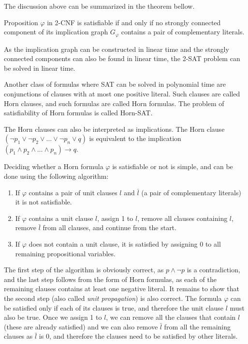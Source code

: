 The discussion above can be summarized in the theorem bellow.

\begin{theorem}
Proposition $\varphi$ in 2-CNF is satisfiable if and only if no strongly connected component of its implication graph $G_\varphi$ contains a pair of complementary literals.
\end{theorem}

As the implication graph can be constructed in linear time and the strongly connected components can also be found in linear time, the 2-SAT problem can be solved in linear time.

Another class of formulas where SAT can be solved in polynomial time are conjunctions of clauses with at most one positive literal. Such clauses are called Horn clauses, and such formulas are called Horn formulas. The problem of satisfiability of Horn formulas is called Horn-SAT.

The Horn clauses can also be interpreted as implications. The Horn clause $(\neg p_1 \lor \neg p_2 \lor \dots \lor \neg p_n \lor q)$ is equivalent to the implication $(p_1 \land p_2 \land \dots \land p_n) \to q$.

Deciding whether a Horn formula $\varphi$ is satisfiable or not is simple, and can be done using the following algorithm:

\begin{enumerate}
  \item If $\varphi$ contains a pair of unit clauses $l$ and $\bar{l}$ (a pair of complementary literals) it is not satisfiable.
  \item If $\varphi$ contains a unit clause $l$, assign 1 to $l$, remove all clauses containing $l$, remove $\bar{l}$ from all clauses, and continue from the start.
  \item If $\varphi$ does not contain a unit clause, it is satisfied by assigning 0 to all remaining propositional variables.
\end{enumerate}

The first step of the algorithm is obviously correct, as $p \land \neg p$ is a contradiction, and the last step follows from the form of Horn formulas, as each of the remaining clauses contains at least one negative literal. It remains to show that the second step (also called \emph{unit propagation}) is also correct. The formula $\varphi$ can be satisfied only if each of its clauses is true, and therefore the unit clause $l$ must also be true. Once we assign 1 to $l$, we can remove all the clauses that contain $l$ (these are already satisfied) and we can also remove $\bar{l}$ from all the remaining clauses as $\bar{l}$ is 0, and therefore the clauses need to be satisfied by other literals.

